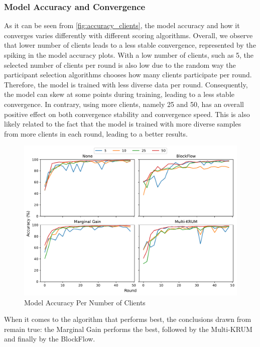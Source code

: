 \subsubsection{Model Accuracy and Convergence}

As it can be seen from \autoref{fig:accuracy_clients}, the model accuracy and how it converges varies differently with different scoring algorithms. Overall, we observe that lower number of clients leads to a less stable convergence, represented by the spiking in the model accuracy plots. With a low number of clients, such as 5, the selected number of clients per round is also low due to the random way the participant selection algorithms chooses how many clients participate per round. Therefore, the model is trained with less diverse data per round. Consequently, the model can skew at some points during training, leading to a less stable convergence. In contrary, using more clients, namely 25 and 50, has an overall positive effect on both convergence stability and convergence speed. This is also likely related to the fact that the model is trained with more diverse samples from more clients in each round, leading to a better results.

\begin{figure}[!ht]
    \centering
    \includegraphics[width=\textwidth]{graphics/clients/accuracy.pdf}
    \caption{Model Accuracy Per Number of Clients}
    \label{fig:accuracy_clients}
\end{figure}

When it comes to the algorithm that performs best, the conclusions drawn from  remain true: the Marginal Gain performs the best, followed by the Multi-KRUM and finally by the BlockFlow.

